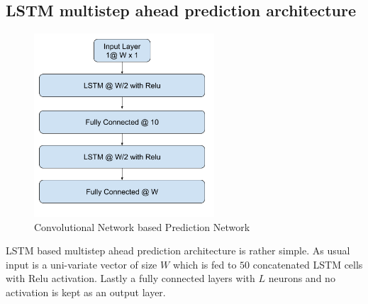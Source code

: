\documentclass[12pt]{article}
\begin{document}
\subsection{LSTM multistep ahead prediction architecture}
\begin{figure}[H]
\centering
        \includegraphics[width=0.6\textwidth]{images/architecture/LstmAutoencoder.png}
    \caption{Convolutional Network based Prediction Network}
    \label{generalAnomalyDetectionFrameWork}
\end{figure}

LSTM based multistep ahead prediction architecture is rather simple. As usual input is a uni-variate vector of size  $W$ which is fed to $50$ concatenated LSTM cells with Relu activation. Lastly a fully connected layers with $L$ neurons and no activation is kept as an output layer.
\newpage
\end{document}
